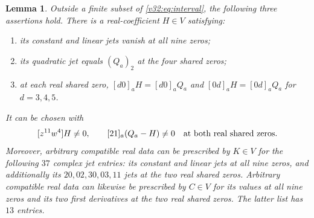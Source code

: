 \documentclass[UTF8,11pt]{ctexart}
\newtheorem{lem}[thm]{Lemma}
\theoremstyle{definition}
\numberwithin{equation}{section}
\begin{document}
\begin{lem}\label{v32:lem:jets}
Outside a finite subset of \eqref{v32:eq:interval}, the following
three assertions hold.
There is a real-coefficient $H\in V$ satisfying:
\begin{enumerate}[label=(\roman*)]
\item its constant and linear jets vanish at all nine zeros;
\item its quadratic jet equals $(Q_a)_2$ at the four shared zeros;
\item at each real shared zero,
$[d0]_aH=[d0]_aQ_a$ and $[0d]_aH=[0d]_aQ_a$ for $d=3,4,5$.
\end{enumerate}
It can be chosen with
\begin{equation}\label{v32:eq:nonzerojets}
 [z^{11}w^4]H\ne0,\qquad
 [21]_a(Q_a-H)\ne0
 \quad\hbox{at both real shared zeros}.
\end{equation}
Moreover, arbitrary compatible real data can be prescribed by $K\in V$
for the following $37$ complex jet entries: its constant and linear
jets at all nine zeros, and additionally its $20,02,30,03,11$ jets
at the two real shared zeros. Arbitrary compatible real data can
likewise be prescribed by $C\in V$ for its values at all nine
zeros and its two first derivatives at the two real shared zeros.
The latter list has $13$ entries.
\end{lem}
\end{document}
